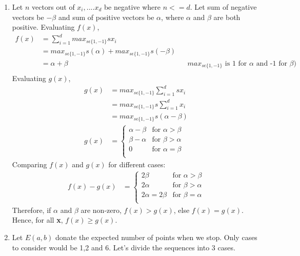 \documentclass[12pt]{article}
\begin{document}
\begin{enumerate}[label=(\alph*)]
\linebreak
\item Let $n$ vectors out of $x_i, .... x_d$ be negative where $n <= d$. Let sum of negative vectors be $-\beta$ and sum of positive vectors be $\alpha$, where $\alpha$ and $\beta$ are both positive.
Evaluating $f(x)$,
\begin{align*}
f(x) & = \sum_{i=1}^{d} max_{s\epsilon\{1,-1\}} sx_i \\
& =  max_{s\epsilon\{1,-1\}} s(\alpha) + max_{s\epsilon\{1,-1\}} s(-\beta)\\
& =  \alpha + \beta && \text{$max_{s\epsilon\{1,-1\}}$ is 1 for $\alpha$ and -1 for $\beta$)}\\
\end{align*}
\linebreak
Evaluating $g(x)$,
\begin{equation*}\
\begin{split}
g(x) & = max_{s\epsilon\{1,-1\}}\sum_{i=1}^{d} sx_i \\
& = max_{s\epsilon\{1,-1\}}s\sum_{i=1}^{d} x_i \\
& = max_{s\epsilon\{1,-1\}}s(\alpha - \beta)\\
g(x) & = \begin{cases}
\alpha - \beta & \text{for } \alpha > \beta \\
\beta - \alpha & \text{for } \beta > \alpha \\
0 & \text{for } \alpha = \beta \\
\end{cases}
\end{split}
\end{equation*}
Comparing $f(x)$ and $g(x)$ for different cases:
\begin{equation*}\
\begin{split}
f(x) - g(x) & = \begin{cases}
2\beta & \text{for } \alpha > \beta \\
2\alpha & \text{for } \beta > \alpha \\
2\alpha = 2\beta & \text{for } \beta = \alpha \\
\end{cases}
\end{split}
\end{equation*}
Therefore, if $\alpha$ and $\beta$ are non-zero, $f(x) > g(x)$, else $f(x) = g(x)$. Hence, for all \textbf{x}, $f(x) \geq g(x)$. \\
\linebreak
\item Let $E(a, b)$ donate the expected number of points when we stop. Only cases to consider would be 1,2 and 6. Let's divide the sequences into 3 cases. \\

\end{enumerate}
\end{document}
